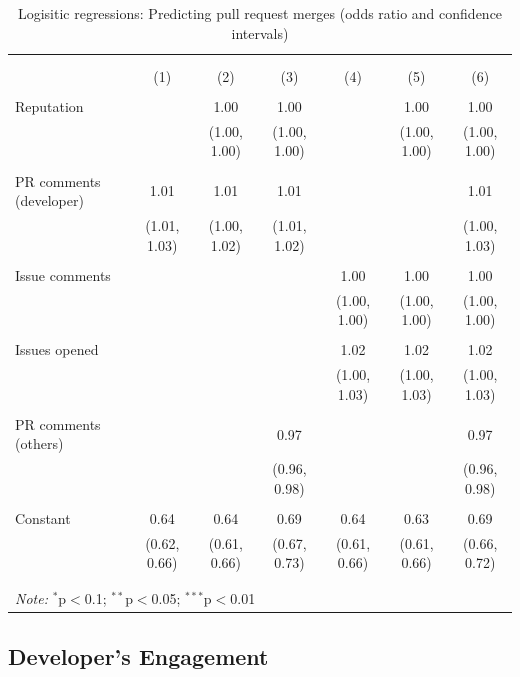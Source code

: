 \documentclass{sigchi}
\begin{document}
\begin{table}[!htbp] \centering 
  \caption{Logisitic regressions: Predicting pull request merges (odds ratio and confidence intervals)} 
  \label{tbl:logit_odds} 
\begin{tabular}{@{\extracolsep{5pt}}lcccccc} 
\\[-1.8ex]\hline 
\hline \\[-1.8ex] 
\\[-1.8ex] & (1) & (2) & (3) & (4) & (5) & (6)\\ 
\hline \\[-1.8ex] 
 Reputation &  & 1.00 & 1.00 &  & 1.00 & 1.00 \\ 
  &  & (1.00, 1.00) & (1.00, 1.00) &  & (1.00, 1.00) & (1.00, 1.00) \\ 
  & & & & & & \\
 PR comments (developer) & 1.01 & 1.01 & 1.01 &  &  & 1.01 \\ 
  & (1.01, 1.03) & (1.00, 1.02) & (1.01, 1.02) &  &  & (1.00, 1.03) \\ 
  & & & & & & \\ 
 Issue comments &  &  &  & 1.00 & 1.00 & 1.00 \\ 
  &  &  &  & (1.00, 1.00) & (1.00, 1.00) & (1.00, 1.00) \\ 
  & & & & & & \\ 
 Issues opened &  &  &  & 1.02 & 1.02 & 1.02 \\ 
  &  &  &  & (1.00, 1.03) & (1.00, 1.03) & (1.00, 1.03) \\ 
  & & & & & & \\ 
  PR comments (others) &  &  & 0.97 &  &  & 0.97 \\ 
   &  &  & (0.96, 0.98) &  &  & (0.96, 0.98) \\ 
   & & & & & & \\
 Constant & 0.64 & 0.64 & 0.69 & 0.64 & 0.63 & 0.69 \\ 
  & (0.62, 0.66) & (0.61, 0.66) & (0.67, 0.73) & (0.61, 0.66) & (0.61, 0.66) & (0.66, 0.72) \\ 
  & & & & & & \\ 
\hline \\[-1.8ex] 

\multicolumn{7}{l}{\textit{Note:} $^{*}$p$<$0.1; $^{**}$p$<$0.05; $^{***}$p$<$0.01} \\ 
\end{tabular} 
\end{table}

\subsection{Developer's Engagement} \label{results_engagement}
\end{document}
